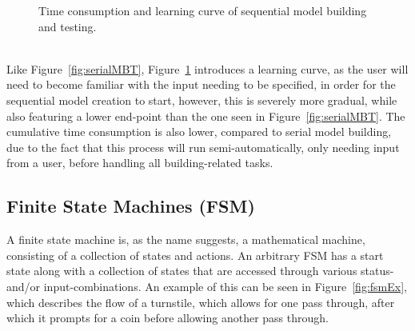 \begin{description}
\begin{figure}[h]
    \caption{Time consumption and learning curve of sequential model building and testing.}
    \label{fig:sequenceMBT}
  \end{figure}\\
  Like Figure~\ref{fig:serialMBT}, Figure~\ref{fig:sequenceMBT} introduces a learning curve, as the user will need to become familiar with the input needing to be specified, in order for the sequential model creation to start, however, this is severely more gradual, while also featuring a lower end-point than the one seen in Figure~\ref{fig:serialMBT}. The cumulative time consumption is also lower, compared to serial model building, due to the fact that this process will run semi-automatically, only needing input from a user, before handling all building-related tasks.
\end{description}
\newpage
\subsection{Finite State Machines (FSM)}
A finite state machine is, as the name suggests, a mathematical machine, consisting of a collection of states and actions. An arbitrary FSM has a start state along with a collection of states that are accessed through various status- and/or input-combinations. An example of this can be seen in Figure~\ref{fig:fsmEx}, which describes the flow of a turnstile, which allows for one pass through, after which it prompts for a coin before allowing another pass through.

